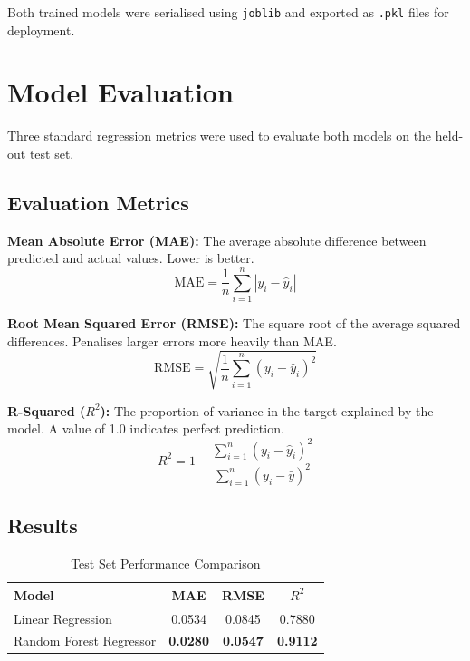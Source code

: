 \documentclass[12pt, a4paper]{article}
\begin{document}
Both trained models were serialised using \texttt{joblib} and exported as \texttt{.pkl} files for deployment.

\newpage
\section{Model Evaluation}

Three standard regression metrics were used to evaluate both models on the held-out test set.

\subsection{Evaluation Metrics}

\textbf{Mean Absolute Error (MAE):} The average absolute difference between predicted and actual values. Lower is better.
\begin{equation}
    \text{MAE} = \frac{1}{n} \sum_{i=1}^{n} |y_i - \hat{y}_i|
\end{equation}

\textbf{Root Mean Squared Error (RMSE):} The square root of the average squared differences. Penalises larger errors more heavily than MAE.
\begin{equation}
    \text{RMSE} = \sqrt{\frac{1}{n} \sum_{i=1}^{n} (y_i - \hat{y}_i)^2}
\end{equation}

\textbf{R-Squared ($R^2$):} The proportion of variance in the target explained by the model. A value of 1.0 indicates perfect prediction.
\begin{equation}
    R^2 = 1 - \frac{\sum_{i=1}^{n} (y_i - \hat{y}_i)^2}{\sum_{i=1}^{n} (y_i - \bar{y})^2}
\end{equation}

\subsection{Results}

\begin{table}[H]
    \centering
    \caption{Test Set Performance Comparison}
    \begin{tabular}{lccc}
        \toprule
        \textbf{Model} & \textbf{MAE} & \textbf{RMSE} & \textbf{$R^2$} \\
        \midrule
        Linear Regression & 0.0534 & 0.0845 & 0.7880 \\
        \rowcolor{solarblue!8} Random Forest Regressor & \textbf{0.0280} & \textbf{0.0547} & \textbf{0.9112} \\
        \bottomrule
    \end{tabular}
\end{table}
\end{document}
